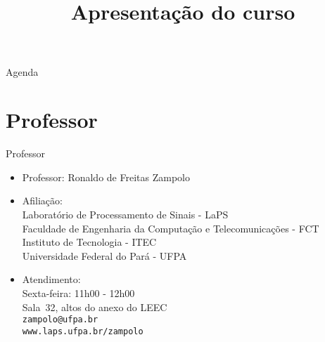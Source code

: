 


\title{\cursogrande\\ \vspace{1cm}Apresentação do curso}


   \maketitle[randomdots={false}]
   \begin{slide}{Agenda}
      \tableofcontents[content=sections]
   \end{slide}

   \section[ slide = false ]{Professor }
      \begin{slide}[toc=]{Professor}
         \begin{itemize}
            \item Professor: Ronaldo de Freitas Zampolo
            \item Afiliação:\\
                  Laboratório de Processamento de Sinais - LaPS\\
                  Faculdade de Engenharia da Computação e Telecomunicações - FCT\\
                  Instituto de Tecnologia - ITEC\\
                  Universidade Federal do Pará - UFPA
            \item Atendimento:\\
                  Sexta-feira: 11h00 - 12h00\\
                  Sala~32, altos do anexo do LEEC\\
                  \texttt{zampolo@ufpa.br}\\ 
                  \texttt{www.laps.ufpa.br/zampolo}
         \end{itemize}
      \end{slide}
      
